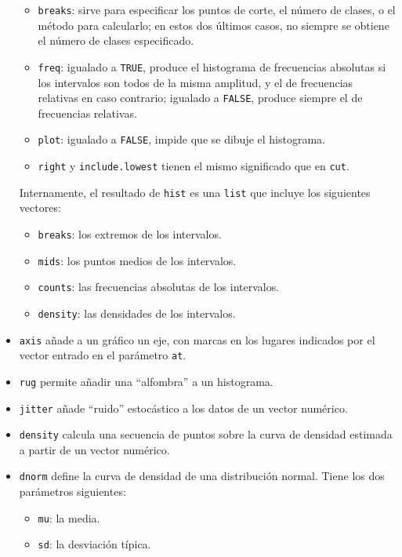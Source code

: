\documentclass[]{book}
\providecommand{\tightlist}{%
  \setlength{\itemsep}{0pt}\setlength{\parskip}{0pt}}
\theoremstyle{definition}
\theoremstyle{definition}
\theoremstyle{definition}
\theoremstyle{remark}
\begin{document}
\begin{itemize}
  \begin{itemize}
  \item
    \texttt{breaks}: sirve para especificar los puntos de corte, el número de clases, o el método para calcularlo; en estos dos últimos casos, no siempre se obtiene el número de clases especificado.
  \item
    \texttt{freq}: igualado a \texttt{TRUE}, produce el histograma de frecuencias absolutas si los intervalos son todos de la misma amplitud, y el de frecuencias relativas en caso contrario; igualado a \texttt{FALSE}, produce siempre el de frecuencias relativas.
  \item
    \texttt{plot}: igualado a \texttt{FALSE}, impide que se dibuje el histograma.
  \item
    \texttt{right} y \texttt{include.lowest} tienen el mismo significado que en \texttt{cut}.
  \end{itemize}

  Internamente, el resultado de \texttt{hist} es una \texttt{list} que incluye los siguientes vectores:

  \begin{itemize}
  \item
    \texttt{breaks}: los extremos de los intervalos.
  \item
    \texttt{mids}: los puntos medios de los intervalos.
  \item
    \texttt{counts}: las frecuencias absolutas de los intervalos.
  \item
    \texttt{density}: las densidades de los intervalos.
  \end{itemize}
\item
  \texttt{axis} añade a un gráfico un eje, con marcas en los lugares indicados por el vector entrado en el parámetro \texttt{at}.
\item
  \texttt{rug} permite añadir una ``alfombra'' a un histograma.
\item
  \texttt{jitter} añade ``ruido'' estocástico a los datos de un vector numérico.
\item
  \texttt{density} calcula una secuencia de puntos sobre la curva de densidad estimada a partir de un vector numérico.
\item
  \texttt{dnorm} define la curva de densidad de una distribución normal. Tiene los dos parámetros siguientes:

  \begin{itemize}
  \tightlist
  \item
    \texttt{mu}: la media.
  \item
    \texttt{sd}: la desviación típica.
  \end{itemize}
\end{itemize}
\end{document}
